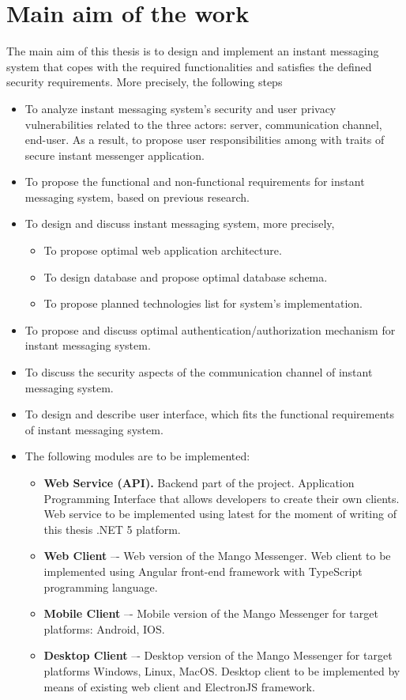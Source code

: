 \chapter{Main aim of the work}\label{ch:main-aim-of-the-work}

The main aim of this thesis is to design and implement an instant messaging system
that copes with the required functionalities and satisfies the defined security requirements.
More precisely, the following steps
\begin{itemize}
    \item To analyze instant messaging system's security and user privacy vulnerabilities related to the three
    actors: server, communication channel, end-user.
    As a result, to propose user responsibilities among with traits of secure instant messenger application.
    \item To propose the functional and non-functional requirements for instant messaging system, based on previous
    research.
    \item To design and discuss instant messaging system, more precisely,
    \begin{itemize}
        \item To propose optimal web application architecture.
        \item To design database and propose optimal database schema.
        \item To propose planned technologies list for system's implementation.
    \end{itemize}
    \item To propose and discuss optimal authentication/authorization mechanism for instant messaging system.
    \item To discuss the security aspects of the communication channel of instant messaging system.
    \item To design and describe user interface, which fits the functional requirements of instant messaging system.
    \item The following modules are to be implemented:
    \begin{itemize}
        \item \textbf{Web Service (API).} Backend part of the project.
        Application Programming Interface that allows developers to create their own clients.
        Web service to be implemented using latest for the moment of writing of this thesis .NET 5 platform.
        \item \textbf{Web Client} –- Web version of the Mango Messenger.
        Web client to be implemented using Angular front-end framework with TypeScript programming language.
        \item \textbf{Mobile Client} –- Mobile version of the Mango Messenger for target platforms: Android, IOS\@.
        \item \textbf{Desktop Client} –- Desktop version of the Mango Messenger for target platforms Windows, Linux, MacOS\@.
        Desktop client to be implemented by means of existing web client and ElectronJS framework.
    \end{itemize}
\end{itemize}